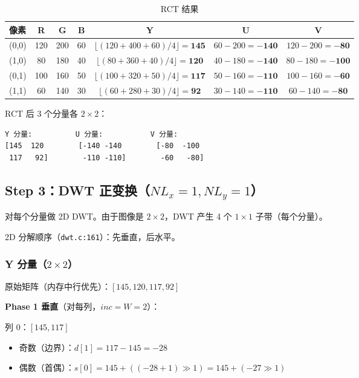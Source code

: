 \begin{table}[H]
\centering
\caption{RCT 结果}
\label{tab:e2e-rct}
\footnotesize
\setlength{\tabcolsep}{4pt}
\begin{tabular}{@{}lcccccc@{}}
\toprule
像素 & R & G & B & \multicolumn{1}{c}{Y} & \multicolumn{1}{c}{U} & \multicolumn{1}{c}{V} \\
\midrule
(0,0) & 120 & 200 & 60  & $\lfloor(120{+}400{+}60)/4\rfloor{=}\mathbf{145}$ & $60{-}200{=}\mathbf{-140}$ & $120{-}200{=}\mathbf{-80}$ \\
(1,0) & 80  & 180 & 40  & $\lfloor(80{+}360{+}40)/4\rfloor{=}\mathbf{120}$  & $40{-}180{=}\mathbf{-140}$ & $80{-}180{=}\mathbf{-100}$ \\
(0,1) & 100 & 160 & 50  & $\lfloor(100{+}320{+}50)/4\rfloor{=}\mathbf{117}$  & $50{-}160{=}\mathbf{-110}$ & $100{-}160{=}\mathbf{-60}$ \\
(1,1) & 60  & 140 & 30  & $\lfloor(60{+}280{+}30)/4\rfloor{=}\mathbf{92}$   & $30{-}140{=}\mathbf{-110}$ & $60{-}140{=}\mathbf{-80}$ \\
\bottomrule
\end{tabular}
\end{table}

RCT 后 3 个分量各 $2\times2$：

\begin{lstlisting}[numbers=none]
Y 分量:          U 分量:           V 分量:
[145  120        [-140 -140        [-80  -100
 117   92]        -110 -110]        -60   -80]
\end{lstlisting}

\subsection{Step 3：DWT 正变换（$NL_x=1, NL_y=1$）}

对每个分量做 2D DWT。由于图像是 $2\times2$，DWT 产生 4 个 $1\times1$ 子带（每个分量）。

2D 分解顺序（\texttt{dwt.c:161}）：先垂直，后水平。

\subsubsection{Y 分量（$2\times2$）}

原始矩阵（内存中行优先）：$[145, 120, 117, 92]$

\textbf{Phase 1 垂直}（对每列，$\mathit{inc} = W = 2$）：

列 0：$[145, 117]$
\begin{itemize}
  \item 奇数（边界）：$d[1] = 117 - 145 = -28$
  \item 偶数（首偶）：$s[0] = 145 + ((-28 + 1) \gg 1) = 145 + (-27 \gg 1)$
\end{itemize}

